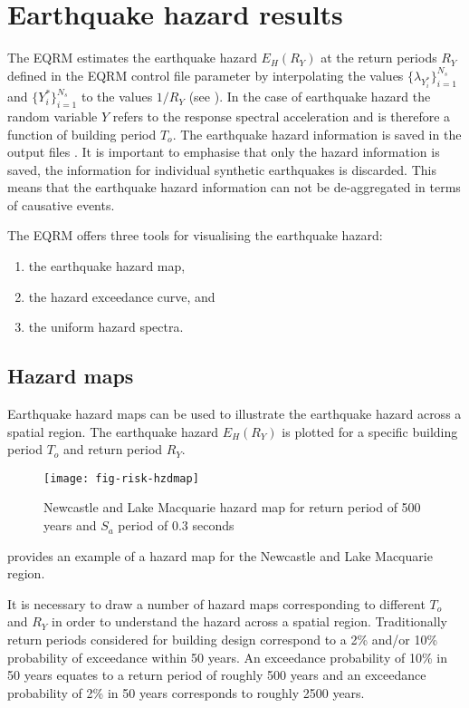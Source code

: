 \section{Earthquake hazard results}
\label{sec:risk-hzd-results} The EQRM estimates the earthquake
hazard $E_H(R_Y)$ at the return periods $R_Y$ defined in the
EQRM control file parameter  by    
interpolating the values $\{ \lambda_{Y_i^*}\}_{i=1}^{N_s}$ and
$\{Y_i^*\}_{i=1}^{N_s}$ to the values $1/R_Y$ (see
). In the case of earthquake hazard the
random variable $Y$ refers to the response spectral
acceleration and is
therefore a function of building period $T_o$. The earthquake
hazard information is saved in the output files
. It is important to
emphasise that only the hazard information is saved, the
information for individual synthetic earthquakes is discarded.
This means that the earthquake hazard information can not be
de-aggregated in terms of causative events.

The EQRM offers three tools for visualising the earthquake hazard:
\begin{enumerate}
\item the earthquake hazard map, \item the hazard exceedance
curve, and \item the uniform hazard spectra.
\end{enumerate}

\subsection{Hazard maps}

Earthquake hazard maps can be used to illustrate the earthquake
hazard across a spatial region. The earthquake hazard $E_H(R_Y)$
is plotted for a specific building period $T_o$ and return period
$R_Y$.
\begin{figure}
\texttt{[image: fig-risk-hzdmap]}
\caption{Newcastle and Lake Macquarie hazard map for return period
of 500 years and $S_a$ period of 0.3 seconds}
\label{fig:risk-hazardmap}
\end{figure}
 provides an example of a hazard map for
the Newcastle and Lake Macquarie region.

It is necessary to draw a number of hazard maps corresponding to
different $T_o$ and $R_Y$ in order to understand the hazard across
a spatial region. Traditionally return periods considered for
building design correspond to a 2\% and/or 10\% probability of
exceedance within 50 years. An exceedance probability of 10\% in
50 years equates to a return period of roughly 500 years and an
exceedance probability of 2\% in 50 years corresponds to roughly
2500 years.

